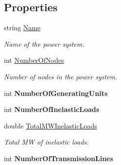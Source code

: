 \subsection*{Properties}
\begin{DoxyCompactItemize}
\item 
string \hyperlink{class_power_system_planning_1_1_power_system_ae511d3a9d7c871726037041b9fdabe14}{Name}
\begin{DoxyCompactList}\small\item\em Name of the power system. \end{DoxyCompactList}\item 
int \hyperlink{class_power_system_planning_1_1_power_system_a3d7abefe87bb1621c5d61644b83ae3d5}{Number\+Of\+Nodes}
\begin{DoxyCompactList}\small\item\em Number of nodes in the power system. \end{DoxyCompactList}\item 
int {\bfseries Number\+Of\+Generating\+Units}\hypertarget{class_power_system_planning_1_1_power_system_ab4f682e8428fe860d1541b3f81a4a5d4}{}\label{class_power_system_planning_1_1_power_system_ab4f682e8428fe860d1541b3f81a4a5d4}

\item 
int {\bfseries Number\+Of\+Inelastic\+Loads}\hypertarget{class_power_system_planning_1_1_power_system_a923796a156c2438a8a95bc34308732bc}{}\label{class_power_system_planning_1_1_power_system_a923796a156c2438a8a95bc34308732bc}

\item 
double \hyperlink{class_power_system_planning_1_1_power_system_ade5099d2eb198a61bf794e14ce4b3018}{Total\+M\+W\+Inelastic\+Loads}
\begin{DoxyCompactList}\small\item\em Total MW of inelastic loads. \end{DoxyCompactList}\item 
int {\bfseries Number\+Of\+Transmission\+Lines}\hypertarget{class_power_system_planning_1_1_power_system_aec138fa5496014f03d2511d62f19ce1f}{}\label{class_power_system_planning_1_1_power_system_aec138fa5496014f03d2511d62f19ce1f}

\end{DoxyCompactItemize}


